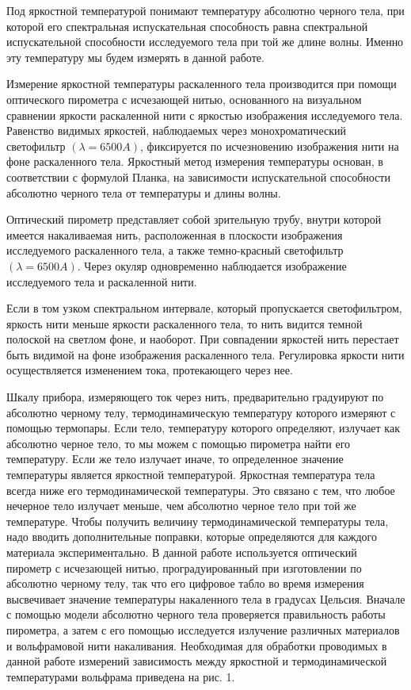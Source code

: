 \documentclass[a4paper, 12pt]{article}
\begin{document}
Под яркостной температурой понимают температуру абсолютно черного тела, при которой его спектральная испускательная способность равна спектральной испускательной способности исследуемого тела при той же длине волны. Именно эту температуру мы будем измерять в данной работе.

Измерение яркостной температуры раскаленного тела производится при помощи оптического пирометра с исчезающей нитью, основанного на визуальном сравнении яркости раскаленной нити с яркостью изображения исследуемого тела. Равенство видимых яркостей, наблюдаемых через монохроматический светофильтр $(\lambda=6500 A)$, фиксируется по исчезновению изображения нити на фоне раскаленного тела. Яркостный метод измерения температуры основан, в соответствии с формулой Планка, на зависимости испускательной способности абсолютно черного тела от температуры и длины волны.

Оптический пирометр представляет собой зрительную трубу, внутри которой имеется накаливаемая нить, расположенная в плоскости изображения исследуемого раскаленного тела, а также темно-красный светофильтр $(\lambda=6500 A)$. Через окуляр одновременно наблюдается изображение исследуемого тела и раскаленной нити.

Если в том узком спектральном интервале, который пропускается светофильтром, яркость нити меньше яркости раскаленного тела, то нить видится темной полоской на светлом фоне, и наоборот. При совпадении яркостей нить перестает быть видимой на фоне изображения раскаленного тела. Регулировка яркости нити осуществляется изменением тока, протекающего через нее.

Шкалу прибора, измеряющего ток через нить, предварительно градуируют по абсолютно черному телу, термодинамическую температуру которого измеряют с помощью термопары. Если тело, температуру которого определяют, излучает как абсолютно черное тело, то мы можем с помощью пирометра найти его температуру. Если же тело излучает иначе, то определенное значение температуры является яркостной температурой. Яркостная температура тела всегда ниже его термодинамической температуры. Это связано с тем, что любое нечерное тело излучает меньше, чем абсолютно черное тело при той же температуре. Чтобы получить величину термодинамической температуры тела, надо вводить дополнительные поправки, которые определяются для каждого материала экспериментально. В данной работе используется оптический пирометр с исчезающей нитью, проградуированный при изготовлении по абсолютно черному телу, так что его цифровое табло во время измерения высвечивает значение температуры накаленного тела в градусах Цельсия. Вначале
с помощью модели абсолютно черного тела проверяется правильность работы пирометра, а затем с его помощью исследуется излучение различных материалов и вольфрамовой нити накаливания. Необходимая для обработки проводимых в данной работе измерений зависимость между яркостной и термодинамической температурами вольфрама приведена на рис. 1.
\end{document}
